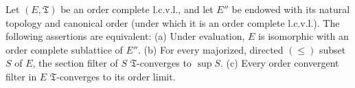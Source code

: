 Let $(E, \mathfrak{T})$ be an order complete l.c.v.l., and let $E''$ be endowed with its natural topology and canonical order (under which it is an order complete l.c.v.l.). The following assertions are equivalent:
(a) Under evaluation, $E$ is isomorphic with an order complete sublattice of $E''$.
(b) For every majorized, directed $(\leq)$ subset $S$ of $E$, the section filter of $S$ $\mathfrak{T}$-converges to $\sup S$.
(c) Every order convergent filter in $E$ $\mathfrak{T}$-converges to its order limit.
